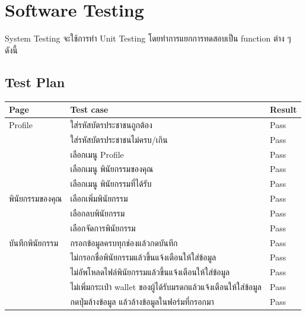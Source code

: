 \documentclass[12pt,oneside,openright,a4paper]{cpe-thai-project}
\begin{document}
\section{Software Testing}
\tab System Testing จะใช้การทำ Unit Testing โดยทำการแยกการทดสอบเป็น function ต่าง ๆ ดังนี้
\subsection {Test Plan}
\begin{table}[h]
\begin{tabular}{|l|l|l|}
\hline
Page                   & Test case                                        &  Result \\ \hline
Profile                & ใส่รหัสบัตรประชาชนถูกต้อง                        &  Pass  \\ \hline
                       & ใส่รหัสบัตรประชาชนไม่ครบ/เกิน                    &   Pass     \\ \hline
                       & เลือกเมนู Profile                            &   Pass     \\ \hline
                       & เลือกเมนู พินัยกรรมของคุณ                     &    Pass    \\ \hline
                       & เลือกเมนู  พินัยกรรมที่ได้รับ                    &   Pass     \\ \hline
พินัยกรรมของคุณ        & เลือกเพิ่มพินัยกรรม                              &   Pass     \\ \hline
                       & เลือกลบพินัยกรรม                                 &     Pass   \\ \hline
                       & เลือกจัดการพินัยกรรม                           &  Pass      \\ \hline
บันทึกพินัยกรรม        & กรอกข้อมูลครบทุกช่องแล้วกดบันทึก                   &Pass        \\ \hline
                       & ไม่กรอกชื่อพินัยกรรมแล้วขึ้นแจ้งเตือนให้ใส่ข้อมูล                      & Pass       \\ \hline
                       & ไม่อัพโหลดไฟล์พินัยกรรมแล้วขึ้นแจ้งเตือนให้ใส่ข้อมูล                      &      Pass  \\ \hline
                       & ไม่เพิ่มกระเป๋า wallet ของผู้ได้รับมรดกแล้วแจ้งเตือนให้ใส่ข้อมูล        &Pass        \\ \hline             
                       & กดปุ่มล้างข้อมูล แล้วล้างข้อมูลในฟอร์มที่กรอกมา       &Pass        \\ \hline                    

\end{tabular}
\end{table}
\end{document}
